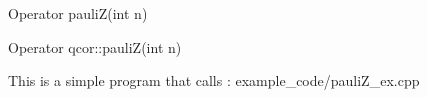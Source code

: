 
\begin{apidefinition}

\begin{Csynopsis}
    Operator pauliZ(int n)
\end{Csynopsis}

\begin{Cppsynopsis}
    Operator qcor::pauliZ(int n)
\end{Cppsynopsis}


\begin{apiarguments}
\end{apiarguments}



\apinotes{
    
}

\begin{apiexamples}

\apicppexample
    { This is a simple program that calls : } 
    { example_code/pauliZ_ex.cpp} 
    {}

\end{apiexamples}

\end{apidefinition}
